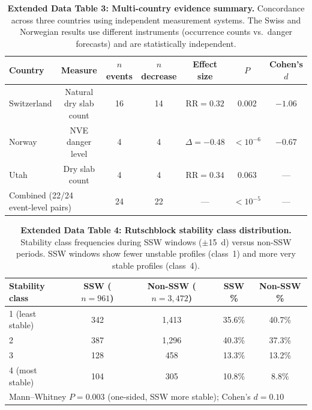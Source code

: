 \documentclass[11pt,letterpaper]{article}
\begin{document}
\begin{table}[!ht]
\centering
\caption{\textbf{Extended Data Table 3: Multi-country evidence summary.}
Concordance across three countries using independent measurement systems. The Swiss and Norwegian results use different instruments (occurrence counts vs.\ danger forecasts) and are statistically independent.}
\label{tab:multi}
\small
\begin{tabular}{lcccccc}
\toprule
Country & Measure & $n$ events & $n$ decrease & Effect size & $P$ & Cohen's $d$ \\
\midrule
Switzerland & Natural dry slab count & 16 & 14 & $\mathrm{RR} = 0.32$ & 0.002 & $-1.06$ \\
Norway & NVE danger level & 4 & 4 & $\Delta = -0.48$ & $< 10^{-6}$ & $-0.67$ \\
Utah & Dry slab count & 4 & 4 & $\mathrm{RR} = 0.34$ & 0.063 & --- \\
\midrule
\multicolumn{2}{l}{Combined (22/24 event-level pairs)} & 24 & 22 & --- & $< 10^{-5}$ & --- \\
\bottomrule
\end{tabular}
\end{table}

\begin{table}[!ht]
\centering
\caption{\textbf{Extended Data Table 4: Rutschblock stability class distribution.}
Stability class frequencies during SSW windows ($\pm$15~d) versus non-SSW periods. SSW windows show fewer unstable profiles (class~1) and more very stable profiles (class~4).}
\label{tab:rutsch}
\small
\begin{tabular}{lcccc}
\toprule
Stability class & SSW ($n = 961$) & Non-SSW ($n = 3{,}472$) & SSW \% & Non-SSW \% \\
\midrule
1 (least stable) & 342 & 1,413 & 35.6\% & 40.7\% \\
2 & 387 & 1,296 & 40.3\% & 37.3\% \\
3 & 128 & 458 & 13.3\% & 13.2\% \\
4 (most stable) & 104 & 305 & 10.8\% & 8.8\% \\
\midrule
\multicolumn{5}{l}{Mann--Whitney $P = 0.003$ (one-sided, SSW more stable); Cohen's $d = 0.10$} \\
\bottomrule
\end{tabular}
\end{table}

\end{document}
